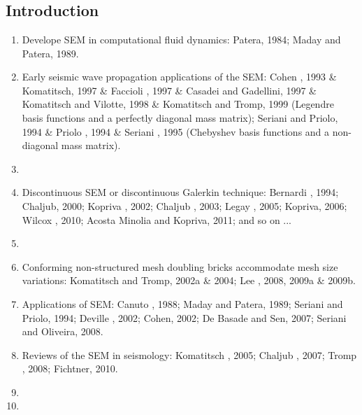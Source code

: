 \renewcommand{\pmk}{Peter\_2011\_GJI\_Adjoint on hexahedral meshes}
\renewcommand{\prf}{FWI/\pmk.pdf}
\renewcommand{\pti}{Forward and adjoint simulations of seismic wave propagation on fully unstructured hexahedral meshes}
\renewcommand{\pay}{Daniel Peter, Dimitri Komatitsch, Yang Luo, \etal, 2011}
\renewcommand{\pjo}{Geophys. J. Int.}
\renewcommand{\pda}{2017/4/14 Fri.}
\section{\pinfo}
\subsection{Introduction}
\begin{enumerate}[\hspace{10mm}*]
  \item Develope SEM in computational fluid dynamics: Patera, 1984; Maday and Patera, 1989.
  \item Early seismic wave propagation applications of the SEM: Cohen \etal, 1993 \& Komatitsch, 1997 \& Faccioli \etal, 1997 \& Casadei and Gadellini, 1997 \& Komatitsch and Vilotte, 1998 \& Komatitsch and Tromp, 1999 (Legendre basis functions and a perfectly diagonal mass matrix); Seriani and Priolo, 1994 \& Priolo \etal, 1994 \& Seriani \etal, 1995 (Chebyshev basis functions and a non-diagonal mass matrix).
  \item \sline
  \item Discontinuous SEM or discontinuous Galerkin technique: Bernardi \etal, 1994; Chaljub, 2000; Kopriva \etal, 2002; Chaljub \etal, 2003; Legay \etal, 2005; Kopriva, 2006; Wilcox \etal, 2010; Acosta Minolia and Kopriva, 2011; and so on ...
  \item \sline
  \item Conforming non-structured mesh doubling bricks accommodate mesh size variations: Komatitsch and Tromp, 2002a \& 2004; Lee \etal, 2008, 2009a \& 2009b.
  \item Applications of SEM: Canuto \etal, 1988; Maday and Patera, 1989; Seriani and Priolo, 1994; Deville \etal, 2002; Cohen, 2002; De Basade and Sen, 2007; Seriani and Oliveira, 2008.
  \item Reviews of the SEM in seismology: Komatitsch \etal, 2005; Chaljub \etal, 2007; Tromp \etal, 2008; Fichtner, 2010.
  \item \sline
  \item
\end{enumerate}\par

